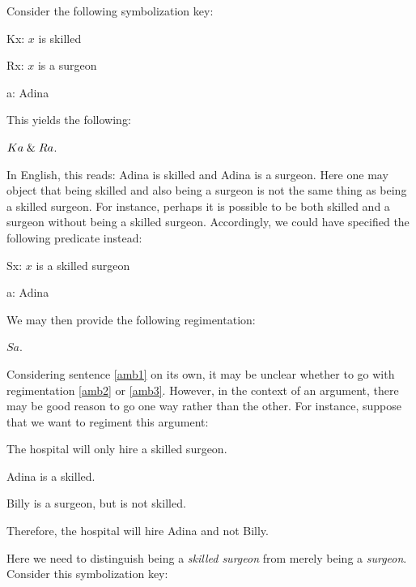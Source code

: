 Consider the following symbolization key:

\begin{ekey}
  \item[Kx:] $x$ is skilled
  \item[Rx:] $x$ is a surgeon
  \item[a:] Adina
\end{ekey}

This yields the following:

\begin{earg}
  \item[\ex{amb2}] $Ka \mathrel\& Ra$.
\end{earg}

In English, this reads: Adina is skilled and Adina is a surgeon.
Here one may object that being skilled and also being a surgeon is not the same thing as being a skilled surgeon.
For instance, perhaps it is possible to be both skilled and a surgeon without being a skilled surgeon.
Accordingly, we could have specified the following predicate instead:

\begin{ekey}
  \item[Sx:] $x$ is a skilled surgeon
  \item[a:] Adina
\end{ekey}

We may then provide the following regimentation:

\begin{earg}
  \item[\ex{amb3}] $Sa$.
\end{earg}

Considering sentence \ref{amb1} on its own, it may be unclear whether to go with regimentation \ref{amb2} or \ref{amb3}.
However, in the context of an argument, there may be good reason to go one way rather than the other.
For instance, suppose that we want to regiment this argument:

\begin{earg}
  \item[] The hospital will only hire a skilled surgeon. 
  \item[] Adina is a skilled.
  \item[] Billy is a surgeon, but is not skilled.
  \item[\therefore] Therefore, the hospital will hire Adina and not Billy.
\end{earg}

Here we need to distinguish being a \textit{skilled surgeon} from merely being a \textit{surgeon}.
Consider this symbolization key:

